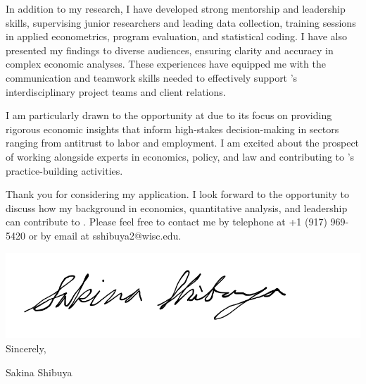 \documentclass[12pt]{letter}
\begin{document}
In addition to my research, I have developed strong mentorship and leadership skills, supervising junior researchers and leading data collection, training sessions 
in applied econometrics, program evaluation, and statistical coding. I have also presented my findings to diverse audiences, ensuring clarity and accuracy 
in complex economic analyses. These experiences have equipped me with the communication and teamwork skills needed to effectively support 
\compName's interdisciplinary project teams and client relations.

I am particularly drawn to the opportunity at \compName due to its focus on providing rigorous economic insights that inform high-stakes decision-making in 
sectors ranging from antitrust to labor and employment. I am excited about the prospect of working alongside experts in economics, policy, and law and 
contributing to \compName's practice-building activities.

Thank you for considering my application. I look forward to the opportunity to discuss how my background in economics, quantitative analysis, and 
leadership can contribute to \compName. Please feel free to contact me by telephone at +1 (917) 969-5420 or by email at sshibuya2@wisc.edu.

\bigskip

\includegraphics[height=4\baselineskip]{signature.png}  \\

\vspace*{-6.5\baselineskip}Sincerely, 

\vspace{2.5\baselineskip}Sakina Shibuya
\end{document}
